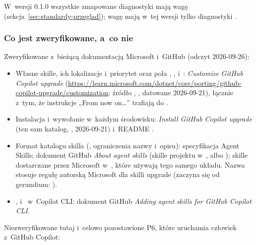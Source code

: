 W~wersji 0.1.0 wszystkie zmapowane diagnostyki  mają wagę 
(sekcja~\ref{sec:standardy-przeglad}); wagę  mają w~tej wersji tylko
diagnostyki .

\subsubsection{Co jest zweryfikowane, a~co nie}

Zweryfikowane z~bieżącą dokumentacją Microsoft i~GitHub (odczyt 2026-09-26):

\begin{itemize}
  \item Własne skille, ich lokalizacje i~priorytet oraz pola ,
        ,  i~:
        \emph{Customize GitHub Copilot upgrade}
        (\url{https://learn.microsoft.com/dotnet/core/porting/github-copilot-upgrade/customization};
        źródło ,
        , datowane 2026-09-21),
        łącznie z~tym, że instrukcje „From now on…” trafiają do
        .
  \item Instalacja i~wywołanie w~każdym środowisku: \emph{Install GitHub Copilot upgrade}
        (ten sam katalog, , 2026-09-21) i~README
        .
  \item Format katalogu skilla (, ograniczenia nazwy i~opisu):
        specyfikacja Agent Skills; dokument GitHub \emph{About agent skills} (skille projektu
        w~,  albo ); skille
        dostarczane przez Microsoft
        w~, które używają tego samego układu. Nazwa
        stosuje regułę autorską Microsoft dla skilli upgrade (zaczyna się od gerundium:
        ).
  \item {},  i~ w~Copilot
        CLI: dokument GitHub \emph{Adding agent skills for GitHub Copilot CLI}.
\end{itemize}

Niezweryfikowane tutaj i~celowo pozostawione P6, które uruchamia człowiek z~GitHub Copilot:

